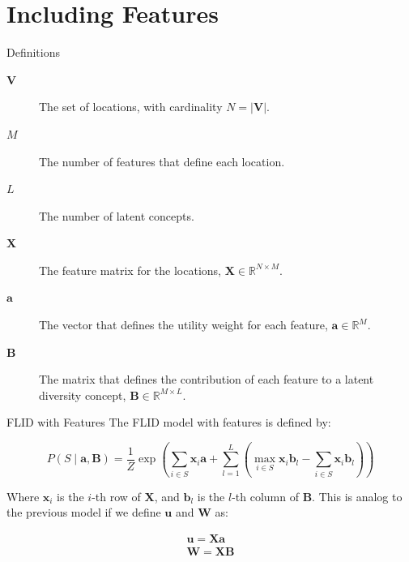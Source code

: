 \documentclass{beamer}
\begin{document}
  \section{Including Features}
  
  \begin{frame}{Definitions}
    \begin{description}
      \item[$\bm{V}$] The set of locations, with cardinality $N = \lvert \bm{V} \rvert$.
      \item[$M$] The number of features that define each location.
      \item[$L$] The number of latent concepts.
      \item[$\bm{X}$] The feature matrix for the locations, $\bm{X} \in \mathbb{R}^{N \times M}$.
      \item[$\bm{a}$] The vector that defines the utility weight for each feature, $\bm{a} \in \mathbb{R}^{M}$.
      \item[$\bm{B}$] The matrix that defines the contribution of each feature to a latent diversity concept, $\bm{B} \in \mathbb{R}^{M \times L}$.
    \end{description}
  \end{frame}
  
  \begin{frame}{FLID with Features}
    The FLID model with features is defined by:
    
    \begin{equation}
      P(S \mid \bm{a}, \bm{B}) = \frac{1}{Z} \exp{\left(\sum_{i \in S}{\bm{x}_{i}\bm{a}} + \sum_{l = 1}^{L}{\left( \max_{i \in S}{\bm{x}_{i}\bm{b}_{l}} - \sum_{i \in S}{\bm{x}_{i}\bm{b}_{l}} \right)} \right)}
    \end{equation}
    
    Where $\bm{x}_{i}$ is the $i$-th row of $\bm{X}$, and $\bm{b}_{l}$ is the $l$-th column of $\bm{B}$. This is analog to the previous model if we define $\bm{u}$ and $\bm{W}$ as:
    
    \begin{eqnarray*}
       \bm{u} = \bm{X}\bm{a} \\
       \bm{W} = \bm{X}\bm{B}
    \end{eqnarray*}
  \end{frame}
  
\end{document}

